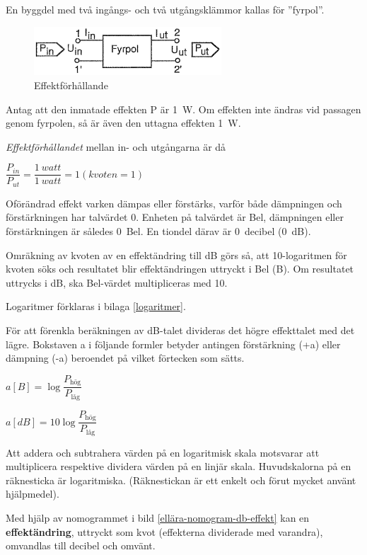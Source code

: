En byggdel med två ingångs- och två utgångsklämmor kallas för ''fyrpol''.

\begin{figure}[ht]
\begin{center}
\includegraphics[width=7cm]{images/cropped_pdfs/bild_2_1-32.pdf}
\caption{Effektförhållande}
\label{fig:BildII1-32}
\end{center}
\end{figure}

Antag att den inmatade effekten P är 1~W.
Om effekten inte ändras vid passagen genom fyrpolen, så är även den uttagna
effekten 1~W.

\emph{Effektförhållandet} mellan in- och utgångarna är då

\(\dfrac{P_{in}}{P_{ut}} = \dfrac{1\ watt}{1\ watt} = 1 (kvoten = 1)\)

Oförändrad effekt varken dämpas eller förstärks, varför både dämpningen och
förstärkningen har talvärdet 0.
Enheten på talvärdet är Bel, dämpningen eller förstärkningen är således 0~Bel.
En tiondel därav är 0~decibel (0~dB).

Omräkning av kvoten av en effektändring till dB görs så, att 10-logaritmen för
kvoten söks och resultatet blir effektändringen uttryckt i Bel (B). Om
resultatet uttrycks i dB, ska Bel-värdet multipliceras med 10.

Logaritmer förklaras i bilaga \ref{logaritmer}.

För att förenkla beräkningen av dB-talet divideras det högre effekttalet med det
lägre.
Bokstaven a i följande formler betyder antingen förstärkning (+a) eller
dämpning (-a) beroendet på vilket förtecken som sätts.

\(a[B] = \log \dfrac{P_\text{hög}}{P_\text{låg}}\)

\(a[dB] = 10\log \dfrac{P_\text{hög}}{P_\text{låg}}\)

Att addera och subtrahera värden på en logaritmisk skala motsvarar att
multiplicera respektive dividera värden på en linjär skala.
Huvudskalorna på en räknesticka är logaritmiska.
(Räknestickan är ett enkelt och förut mycket använt hjälpmedel).

Med hjälp av nomogrammet i bild \ref{ellära-nomogram-db-effekt} kan en
\textbf{effektändring}, uttryckt som kvot (effekterna dividerade med varandra),
omvandlas till decibel och omvänt.

